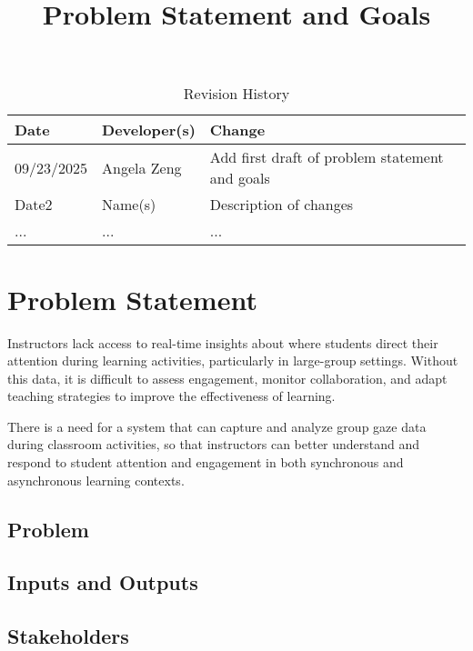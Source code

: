 \documentclass{article}
\title{Problem Statement and Goals\\\progname}
\author{\authname}
\date{}
\begin{document}
\maketitle

\begin{table}[hp]
\caption{Revision History} \label{TblRevisionHistory}
\begin{tabularx}{\textwidth}{llX}
\toprule
\textbf{Date} & \textbf{Developer(s)} & \textbf{Change}\\
\midrule
09/23/2025 & Angela Zeng & Add first draft of problem statement and goals\\
Date2 & Name(s) & Description of changes\\
... & ... & ...\\
\bottomrule
\end{tabularx}
\end{table}

\section{Problem Statement}

Instructors lack access to real-time insights about where students direct their 
attention during learning activities, particularly in large-group settings. Without 
this data, it is difficult to assess engagement, monitor collaboration, and adapt 
teaching strategies to improve the effectiveness of learning. 

There is a need for a system that can capture and analyze group gaze data during 
classroom activities, so that instructors can better understand and respond to 
student attention and engagement in both synchronous and asynchronous 
learning contexts.

\subsection{Problem}

\subsection{Inputs and Outputs}


\subsection{Stakeholders}
\end{document}
